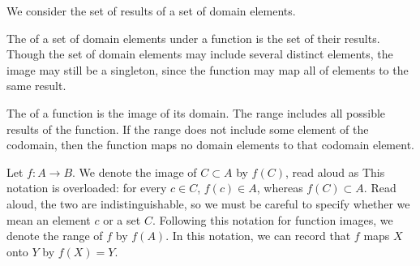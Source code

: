 

We consider the set of results
of a set of domain elements.


The  of a set
of domain elements under
a function is the set of
their results.
Though the set of domain elements
may include several distinct elements,
the image may still be a singleton,
since the function may map
all of elements to the same result.

The  of a function
is the image of its domain.
The range includes all possible
results of the function.
If the range does not include
some element of the codomain,
then the function maps no
domain elements to that codomain
element.


Let $f: A \to B$.
We denote the image of $C \subset A$ by $f(C)$, read aloud as 
This notation is overloaded: for every $c \in C$, $f(c) \in A$, whereas $f(C) \subset A$.
Read aloud, the two are indistinguishable, so we must be careful to specify whether we mean an element $c$ or a set $C$.
Following this notation for function images, we denote the range of $f$ by $f(A)$.
In this notation, we can record that $f$ maps $X$ onto $Y$ by $f(X) = Y$.

\blankpage
